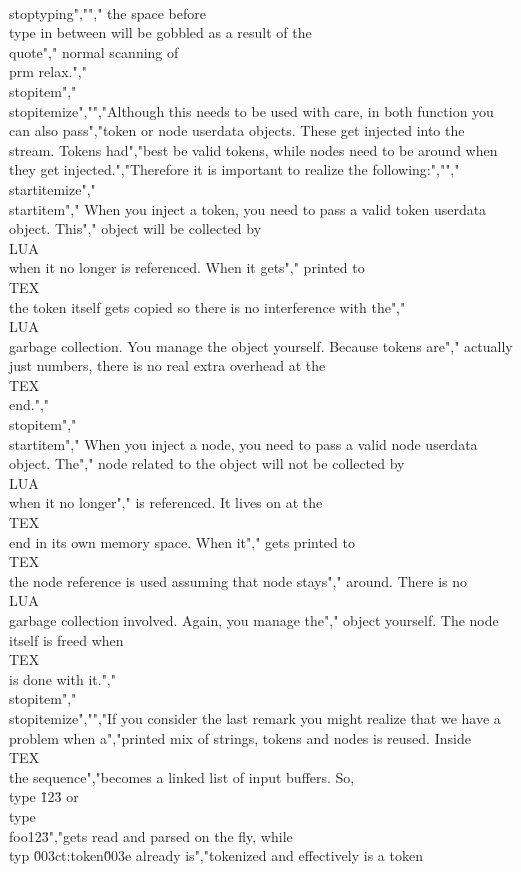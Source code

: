\\stoptyping","","    the space before \\type {in between} will be gobbled as a result of the \\quote","    {normal} scanning of \\prm {relax}.","\\stopitem","\\stopitemize","","Although this needs to be used with care, in both function you can also pass","token or node userdata objects. These get injected into the stream. Tokens had","best be valid tokens, while nodes need to be around when they get injected.","Therefore it is important to realize the following:","","\\startitemize","\\startitem","    When you inject a token, you need to pass a valid token userdata object. This","    object will be collected by \\LUA\\ when it no longer is referenced. When it gets","    printed to \\TEX\\ the token itself gets copied so there is no interference with the","    \\LUA\\ garbage collection. You manage the object yourself. Because tokens are","    actually just numbers, there is no real extra overhead at the \\TEX\\ end.","\\stopitem","\\startitem","    When you inject a node, you need to pass a valid node userdata object. The","    node related to the object will not be collected by \\LUA\\ when it no longer","    is referenced. It lives on at the \\TEX\\ end in its own memory space. When it","    gets printed to \\TEX\\ the node reference is used assuming that node stays","    around. There is no \\LUA\\ garbage collection involved. Again, you manage the","    object yourself. The node itself is freed when \\TEX\\ is done with it.","\\stopitem","\\stopitemize","","If you consider the last remark you might realize that we have a problem when a","printed mix of strings, tokens and nodes is reused. Inside \\TEX\\ the sequence","becomes a linked list of input buffers. So, \\type {\"123\"} or \\type {\"\\foo{123}\"}","gets read and parsed on the fly, while \\typ {\u003ct:token\u003e} already is","tokenized and effectively is a token 